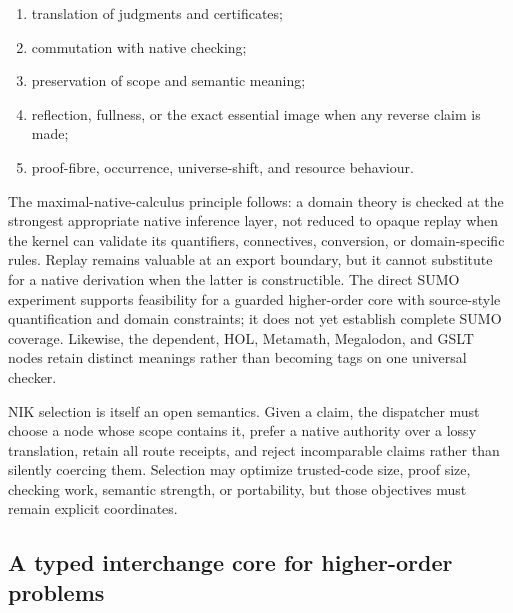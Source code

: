 \documentclass[11pt]{article}
\theoremstyle{definition}
\theoremstyle{remark}
\begin{document}
\begin{enumerate}
\item translation of judgments and certificates;
\item commutation with native checking;
\item preservation of scope and semantic meaning;
\item reflection, fullness, or the exact essential image when any reverse claim
  is made;
\item proof-fibre, occurrence, universe-shift, and resource behaviour.
\end{enumerate}

The maximal-native-calculus principle follows: a domain theory is checked at
the strongest appropriate native inference layer, not reduced to opaque replay
when the kernel can validate its quantifiers, connectives, conversion, or
domain-specific rules.  Replay remains valuable at an export boundary, but it
cannot substitute for a native derivation when the latter is constructible.
The direct SUMO experiment supports feasibility for a guarded higher-order core
with source-style quantification and domain constraints; it does not yet
establish complete SUMO coverage.  Likewise, the dependent, HOL, Metamath,
Megalodon, and GSLT nodes retain distinct meanings rather than becoming tags on
one universal checker.

NIK selection is itself an open semantics.  Given a claim, the dispatcher must
choose a node whose scope contains it, prefer a native authority over a lossy
translation, retain all route receipts, and reject incomparable claims rather
than silently coercing them.  Selection may optimize trusted-code size, proof
size, checking work, semantic strength, or portability, but those objectives
must remain explicit coordinates.

\subsection{A typed interchange core for higher-order problems}
\end{document}
